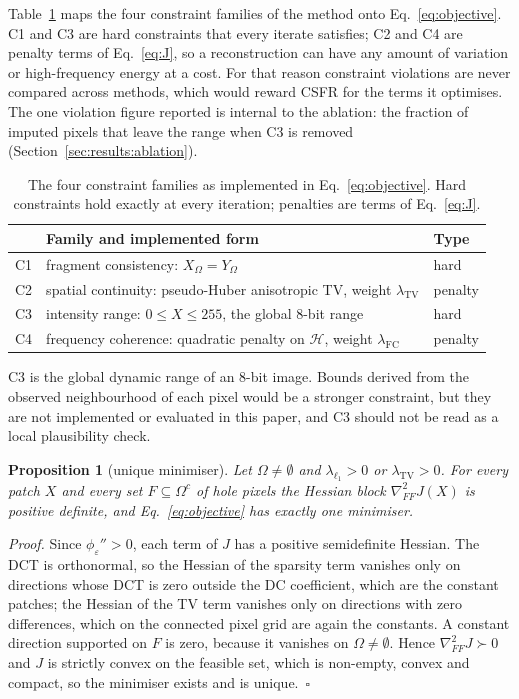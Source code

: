 \documentclass[final,3p]{elsarticle}
\newtheorem{proposition}{Proposition}
\begin{document}
Table~\ref{tab:constraints} maps the four constraint families of the method onto Eq.~\eqref{eq:objective}. C1 and C3 are hard constraints that every iterate satisfies; C2 and C4 are penalty terms of Eq.~\eqref{eq:J}, so a reconstruction can have any amount of variation or high-frequency energy at a cost. For that reason constraint violations are never compared across methods, which would reward CSFR for the terms it optimises. The one violation figure reported is internal to the ablation: the fraction of imputed pixels that leave the range when C3 is removed (Section~\ref{sec:results:ablation}).

\begin{table}[htbp]
\centering
\caption{The four constraint families as implemented in Eq.~\eqref{eq:objective}. Hard constraints hold exactly at every iteration; penalties are terms of Eq.~\eqref{eq:J}.}
\label{tab:constraints}
\begin{tabularx}{\linewidth}{@{}l >{\raggedright\arraybackslash}X l@{}}
\toprule
 & Family and implemented form & Type \\
\midrule
C1 & fragment consistency: $X_{\Omega} = Y_{\Omega}$ & hard \\
C2 & spatial continuity: pseudo-Huber anisotropic TV, weight $\lambda_{\mathrm{TV}}$ & penalty \\
C3 & intensity range: $0 \le X \le 255$, the global 8-bit range & hard \\
C4 & frequency coherence: quadratic penalty on $\mathcal{H}$, weight $\lambda_{\mathrm{FC}}$ & penalty \\
\bottomrule
\end{tabularx}
\end{table}

\label{sec:problem:c3}
C3 is the global dynamic range of an 8-bit image. Bounds derived from the observed neighbourhood of each pixel would be a stronger constraint, but they are not implemented or evaluated in this paper, and C3 should not be read as a local plausibility check.

\begin{proposition}[unique minimiser]
\label{prop:unique}
Let $\Omega \neq \emptyset$ and $\lambda_{\ell_1} > 0$ or $\lambda_{\mathrm{TV}} > 0$. For every patch $X$ and every set $F \subseteq \Omega^{c}$ of hole pixels the Hessian block $\nabla^{2}_{FF} J(X)$ is positive definite, and Eq.~\eqref{eq:objective} has exactly one minimiser.
\end{proposition}
\textit{Proof.} Since $\phi_{\varepsilon}'' > 0$, each term of $J$ has a positive semidefinite Hessian. The DCT is orthonormal, so the Hessian of the sparsity term vanishes only on directions whose DCT is zero outside the DC coefficient, which are the constant patches; the Hessian of the TV term vanishes only on directions with zero differences, which on the connected pixel grid are again the constants. A constant direction supported on $F$ is zero, because it vanishes on $\Omega \neq \emptyset$. Hence $\nabla^{2}_{FF} J \succ 0$ and $J$ is strictly convex on the feasible set, which is non-empty, convex and compact, so the minimiser exists and is unique.~$\square$
\end{document}
